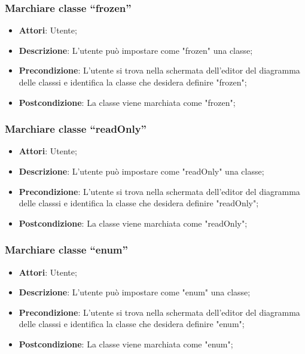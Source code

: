 \documentclass[../AnalisiDeiRequisiti.tex]{subfiles}
\begin{document}
	\subsubsection{Marchiare classe “frozen”}
	\begin{itemize}
		\item \textbf{Attori}: Utente;
		\item \textbf{Descrizione}: L'utente può impostare come "frozen" una classe;
		\item \textbf{Precondizione}: L’utente si trova nella schermata dell’editor del diagramma delle classsi e identifica la classe che desidera definire "frozen";
		\item \textbf{Postcondizione}: La classe viene marchiata come "frozen";
	\end{itemize}
	
	\subsubsection{Marchiare classe “readOnly”}
	\begin{itemize}
		\item \textbf{Attori}: Utente;
		\item \textbf{Descrizione}: L'utente può impostare come "readOnly" una classe;
		\item \textbf{Precondizione}: L’utente si trova nella schermata dell’editor del diagramma delle classsi e identifica la classe che desidera definire "readOnly";
		\item \textbf{Postcondizione}: La classe viene marchiata come "readOnly";
	\end{itemize}
	
	\subsubsection{Marchiare classe “enum”}
	\begin{itemize}
		\item \textbf{Attori}: Utente;
		\item \textbf{Descrizione}: L'utente può impostare come "enum" una classe;
		\item \textbf{Precondizione}: L’utente si trova nella schermata dell’editor del diagramma delle classsi e identifica la classe che desidera definire "enum";
		\item \textbf{Postcondizione}: La classe viene marchiata come "enum";
	\end{itemize}
	
\end{document}
